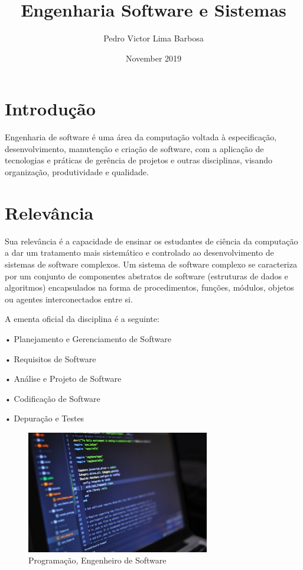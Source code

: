 \documentclass[a4paper, 10pt]{article}
\title{Engenharia Software e Sistemas}
\author{Pedro Victor Lima Barbosa }
\date{November 2019}
\begin{document}
\maketitle

\section{Introdução}
Engenharia de software é uma área da computação voltada à especificação, desenvolvimento, manutenção e criação de software, com a aplicação de tecnologias e práticas de gerência de projetos e outras disciplinas, visando organização, produtividade e qualidade.\citep{wikibooks}

\section{Relevância}
Sua relevância é a capacidade de ensinar os estudantes de ciência da computação a dar um tratamento mais sistemático e controlado ao desenvolvimento de sistemas de software complexos. Um sistema de software complexo se caracteriza por um conjunto de componentes abstratos de software (estruturas de dados e algoritmos) encapsulados na forma de procedimentos, funções, módulos, objetos ou agentes interconectados entre si.\citep{if682}

A ementa oficial da disciplina é a seguinte:

•	Planejamento e Gerenciamento de Software

•	Requisitos de Software

•	Análise e Projeto de Software

•	Codificação de Software

•	Depuração e Testes \citep{if682}

\begin{figure}
    \centering
    \includegraphics[width=8cm]{imagemSoftware.jpg}
    \caption{Programação, Engenheiro de Software}
    \label{fig:my_label}
\end{figure}
\end{document}
